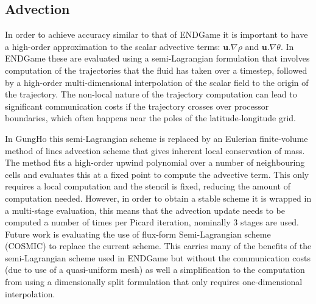 \documentclass[times]{elsarticle}
\begin{document}
\subsection{Advection\label{sec:sub:advection}}
In order to achieve accuracy similar to that of ENDGame it is important to have 
a high-order approximation to the scalar advective terms: $\mathbf{u}.\nabla\rho$ 
and $\mathbf{u}.\nabla\theta$. In ENDGame these are evaluated using a 
semi-Lagrangian formulation that involves computation of the trajectories that 
the fluid has taken over a timestep, followed by a high-order multi-dimensional 
interpolation of the scalar field to the origin of the trajectory. 
The non-local nature of the trajectory computation can 
lead to significant communication costs if the trajectory crosses over processor 
boundaries, which often happens near the poles of the latitude-longitude grid.

In GungHo this semi-Lagrangian scheme is replaced by an Eulerian finite-volume 
method of lines advection scheme that gives inherent local conservation of mass.
The method fits a high-order upwind polynomial over a number of
neighbouring cells and evaluates this at a fixed point to compute the advective 
term. This only requires a local computation and the stencil is fixed, reducing the 
amount of computation needed. However, in order to obtain a stable scheme it is 
wrapped in a multi-stage evaluation, this means that the advection update needs to be 
computed a number of times per Picard iteration, nominally 3 stages are used. 
Future work is evaluating the use of flux-form Semi-Lagrangian scheme (COSMIC) 
\citet{Leonard1996} to replace the current scheme. This carries many of the 
benefits of the semi-Lagrangian scheme used in ENDGame but without the 
communication costs (due to use of a quasi-uniform mesh) as well a simplification 
to the computation from using a dimensionally split formulation that only requires 
one-dimensional interpolation.
\end{document}
